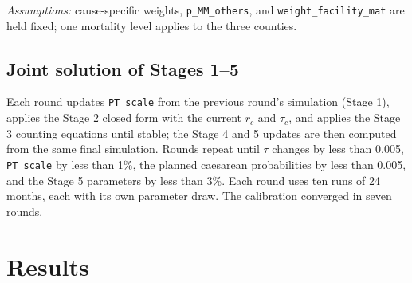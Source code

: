 \documentclass[11pt]{article}
\newcommand{\p}[1]{\texttt{#1}}
\begin{document}
\emph{Assumptions:} cause-specific weights, \p{p\_MM\_others}, and
\p{weight\_facility\_mat} are held fixed; one mortality level applies to
the three counties.

\subsection{Joint solution of Stages 1--5}
\label{sec:joint}

Each round updates \p{PT\_scale} from the previous round's simulation (Stage 1),
applies the Stage 2 closed form with the current $r_c$ and $\tau_c$, and applies
the Stage 3 counting equations until stable; the Stage 4 and 5 updates are then
computed from the same final simulation. Rounds repeat until $\tau$
changes by less than 0.005, \p{PT\_scale} by less than 1\%, the planned
caesarean probabilities by less than 0.005, and the Stage 5 parameters by less
than 3\%. Each round uses ten runs of 24 months, each with its own parameter
draw. The calibration converged in seven rounds.

\section{Results}
\end{document}
